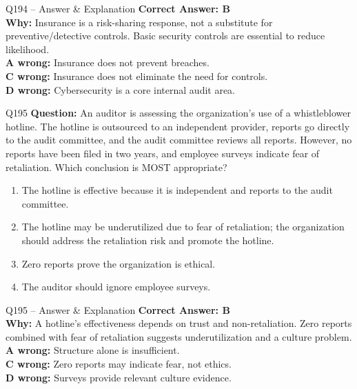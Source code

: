 \documentclass[aspectratio=169,10pt]{beamer}
\begin{document}
	\begin{frame}[t]{Q194 -- Answer \& Explanation}
		\small
		\textbf{Correct Answer: B} \\[4pt]
		\textbf{Why:} Insurance is a risk-sharing response, not a substitute for preventive/detective controls. Basic security controls are essential to reduce likelihood. \\[4pt]
		\textbf{A wrong:} Insurance does not prevent breaches. \\[2pt]
		\textbf{C wrong:} Insurance does not eliminate the need for controls. \\[2pt]
		\textbf{D wrong:} Cybersecurity is a core internal audit area.
	\end{frame}
	
	\begin{frame}[t]{Q195}
		\small
		\textbf{Question:} An auditor is assessing the organization's use of a whistleblower hotline. The hotline is outsourced to an independent provider, reports go directly to the audit committee, and the audit committee reviews all reports. However, no reports have been filed in two years, and employee surveys indicate fear of retaliation. Which conclusion is MOST appropriate?
		\begin{enumerate}[label=\Alph*.,itemsep=1pt,topsep=2pt]
			\item The hotline is effective because it is independent and reports to the audit committee.
			\item The hotline may be underutilized due to fear of retaliation; the organization should address the retaliation risk and promote the hotline.
			\item Zero reports prove the organization is ethical.
			\item The auditor should ignore employee surveys.
		\end{enumerate}
	\end{frame}
	
	\begin{frame}[t]{Q195 -- Answer \& Explanation}
		\small
		\textbf{Correct Answer: B} \\[4pt]
		\textbf{Why:} A hotline's effectiveness depends on trust and non-retaliation. Zero reports combined with fear of retaliation suggests underutilization and a culture problem. \\[4pt]
		\textbf{A wrong:} Structure alone is insufficient. \\[2pt]
		\textbf{C wrong:} Zero reports may indicate fear, not ethics. \\[2pt]
		\textbf{D wrong:} Surveys provide relevant culture evidence.
	\end{frame}
	
\end{document}

